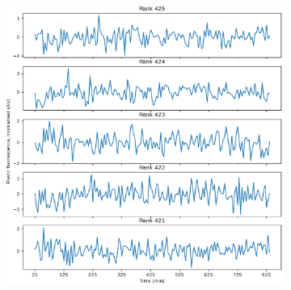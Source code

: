 \begin{figure}[p]
  \centering
  \begin{subfigure}[t]{0.65\textwidth}
  \centering
    \includegraphics[width=\linewidth]{glynn_is20016_3_edit.pdf}
    \caption{
    }
    \label{fig:glynn-worst-ts}
  \end{subfigure}%
  \begin{subfigure}[t]{0.35\textwidth}
  \centering

\end{subfigure}
\end{figure}
